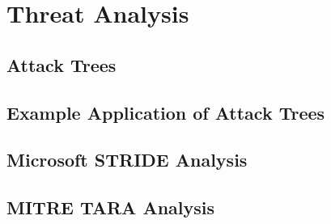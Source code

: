 \section{Threat Analysis}\label{sec:Threat_Analysis}

\subsection{Attack Trees}\label{subsec:Attack_Trees}

\subsection{Example Application of Attack Trees}\label{subsec:Attack_Tree_Example}

\subsection{Microsoft STRIDE Analysis}\label{subsec:STRIDE_Analysis}

\subsection{MITRE TARA Analysis}\label{subsec:TARA_Analysis}

